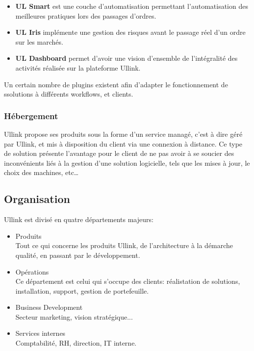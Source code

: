 \documentclass[a4paper, 11pt]{article}
\begin{document}
\begin{itemize}
\item{{\bf UL Smart} est une couche d'automatisation permettant l'automatisation des meilleures pratiques lors des passages d'ordres.}
\item{{\bf UL Iris} implémente une gestion des risques avant le passage réel d'un ordre sur les marchés.}
\item{{\bf UL Dashboard} permet d'avoir une vision d'ensemble de l'intégralité des activités réalisée sur la plateforme Ullink.}
\end{itemize}

Un certain nombre de plugins existent afin d'adapter le fonctionnement de ssolutions à différents workflows, et clients.

\subsubsection{Hébergement}

Ullink propose ses produits sous la forme d'un service managé, c'est à dire géré par Ullink, et mis à disposition du client via une connexion à distance. Ce type de solution présente l'avantage pour le client de ne pas avoir à se soucier des inconvénients liés à la gestion d'une solution logicielle, tels que les mises à jour, le choix des machines, etc\dots

\subsection{Organisation}

Ullink est divisé en quatre départements majeurs:

\begin{itemize}
\item Produits\\
Tout ce qui concerne les produits Ullink, de l'architecture à la démarche qualité, en passant par le développement.

\item Opérations\\
Ce département est celui qui s'occupe des clients: réalistation de solutions, installation, support, gestion de portefeuille.

\item Business Development\\
Secteur marketing, vision stratégique...

\item Services internes\\
Comptabilité, RH, direction, IT interne.
\end{itemize}
\end{document}

